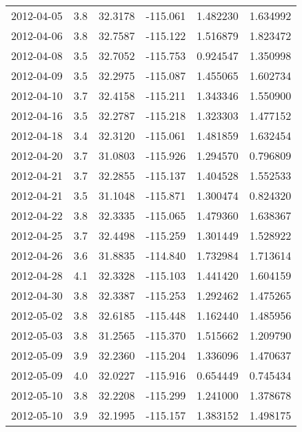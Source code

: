 \begin{tabular}{lrrrrr}
2012-04-05 &       3.8 &  32.3178 &  -115.061 &         1.482230 &         1.634992 \\
2012-04-06 &       3.8 &  32.7587 &  -115.122 &         1.516879 &         1.823472 \\
2012-04-08 &       3.5 &  32.7052 &  -115.753 &         0.924547 &         1.350998 \\
2012-04-09 &       3.5 &  32.2975 &  -115.087 &         1.455065 &         1.602734 \\
2012-04-10 &       3.7 &  32.4158 &  -115.211 &         1.343346 &         1.550900 \\
2012-04-16 &       3.5 &  32.2787 &  -115.218 &         1.323303 &         1.477152 \\
2012-04-18 &       3.4 &  32.3120 &  -115.061 &         1.481859 &         1.632454 \\
2012-04-20 &       3.7 &  31.0803 &  -115.926 &         1.294570 &         0.796809 \\
2012-04-21 &       3.7 &  32.2855 &  -115.137 &         1.404528 &         1.552533 \\
2012-04-21 &       3.5 &  31.1048 &  -115.871 &         1.300474 &         0.824320 \\
2012-04-22 &       3.8 &  32.3335 &  -115.065 &         1.479360 &         1.638367 \\
2012-04-25 &       3.7 &  32.4498 &  -115.259 &         1.301449 &         1.528922 \\
2012-04-26 &       3.6 &  31.8835 &  -114.840 &         1.732984 &         1.713614 \\
2012-04-28 &       4.1 &  32.3328 &  -115.103 &         1.441420 &         1.604159 \\
2012-04-30 &       3.8 &  32.3387 &  -115.253 &         1.292462 &         1.475265 \\
2012-05-02 &       3.8 &  32.6185 &  -115.448 &         1.162440 &         1.485956 \\
2012-05-03 &       3.8 &  31.2565 &  -115.370 &         1.515662 &         1.209790 \\
2012-05-09 &       3.9 &  32.2360 &  -115.204 &         1.336096 &         1.470637 \\
2012-05-09 &       4.0 &  32.0227 &  -115.916 &         0.654449 &         0.745434 \\
2012-05-10 &       3.8 &  32.2208 &  -115.299 &         1.241000 &         1.378678 \\
2012-05-10 &       3.9 &  32.1995 &  -115.157 &         1.383152 &         1.498175 \\

\end{tabular}
